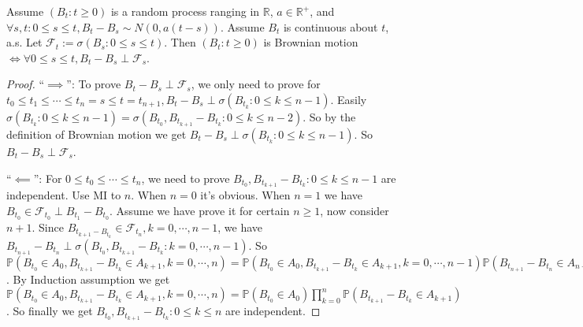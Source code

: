 \documentclass{ctexart}
\newif\ifpreface
\begin{document}
\large
\iffalse
  \setlength{\baselineskip}{1.2em}
  \ifpreface
    
  \else
    \maketitle
  \fi
\fi
{}
\begin{lemma}\label{lem:1}
  Assume \((B_t:t \geq 0)\) is a random process ranging in \(\mathbb{R}\), \(a \in \mathbb{R}^+\), and \(\forall s,t:0 \leq s \leq t,B_t-B_s \sim N(0,a(t-s))\).
  Assume \(B_t\) is continuous about \(t\), a.s.
  Let \(\mathcal{F}_t:=\sigma(B_s:0 \leq s \leq t)\).
  Then \((B_t:t \geq 0)\) is Brownian motion \(\iff \forall 0 \leq s \leq t,B_t - B_s \perp \mathcal{F}_s\).
\end{lemma}

\begin{proof}
  ``\(\implies\)'': To prove \(B_t-B_s \perp \mathcal{F}_s\), we only need to prove for \(t_0 \leq t_1 \leq \cdots \leq t_n=s \leq t=t_{n+1},B_t-B_s \perp \sigma(B_{t_k}:0 \leq k \leq n-1)\).
  Easily \(\sigma(B_{t_k}:0 \leq k \leq n-1)=\sigma(B_{t_0},B_{t_{k+1}}-B_{t_{k}}:0 \leq k \leq n-2)\).
  So by the definition of Brownian motion we get \(B_t-B_s \perp \sigma(B_{t_k}:0 \leq k \leq n-1)\).
  So \(B_t-B_s \perp \mathcal{F}_s\).

  ``\(\impliedby\)'': For \(0 \leq t_0 \leq \cdots \leq t_n\), we need to prove \(B_{t_0},B_{t_{k+1}}-B_{t_k}:0 \leq k \leq n-1\) are independent.
  Use MI to \(n\). When \(n=0\) it's obvious. When \(n=1\) we have \(B_{t_0} \in \mathcal{F}_{t_0} \perp B_{t_1}-B_{t_0}\).
  Assume we have prove it for certain \(n \geq 1\), now consider \(n+1\).
  Since \(B_{t_{k+1}-B_{t_k}} \in \mathcal{F}_{t_n},k=0,\cdots,n-1\), we have \(B_{t_{n+1}}-B_{t_n} \perp \sigma(B_{t_0},B_{t_{k+1}}-B_{t_k}:k=0,\cdots,n-1)\).
  So \(\mathbb{P}(B_{t_0} \in A_0,B_{t_{k+1}}-B_{t_k} \in A_{k+1},k=0,\cdots,n)=\mathbb{P}(B_{t_0} \in A_0,B_{t_{k+1}}-B_{t_k} \in A_{k+1},k=0,\cdots,n-1)\mathbb{P}(B_{t_{n+1}}-B_{t_n} \in A_{n+1})\).
  By Induction assumption we get \(\mathbb{P}(B_{t_0} \in A_0,B_{t_{k+1}}-B_{t_k} \in A_{k+1},k=0,\cdots,n)=\mathbb{P}(B_{t_0}\in A_0) \prod_{k=0}^{n}\mathbb{P}(B_{t_{k+1}}-B_{t_k} \in A_{k+1})\).
  So finally we get \(B_{t_0},B_{t_{k+1}}-B_{t_k}:0 \leq k \leq n\) are independent.
\end{proof}
\end{document}
